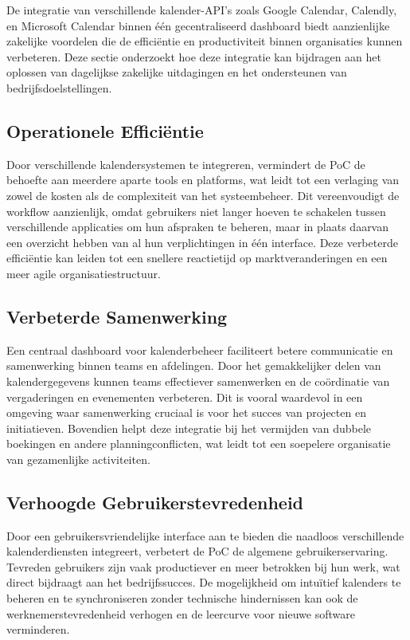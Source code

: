 De integratie van verschillende kalender-API's zoals Google Calendar, Calendly, en Microsoft Calendar binnen één gecentraliseerd dashboard biedt aanzienlijke zakelijke voordelen die de efficiëntie en productiviteit binnen organisaties kunnen verbeteren. Deze sectie onderzoekt hoe deze integratie kan bijdragen aan het oplossen van dagelijkse zakelijke uitdagingen en het ondersteunen van bedrijfsdoelstellingen.

\subsection{Operationele Efficiëntie}

Door verschillende kalendersystemen te integreren, vermindert de PoC de behoefte aan meerdere aparte tools en platforms, wat leidt tot een verlaging van zowel de kosten als de complexiteit van het systeembeheer. Dit vereenvoudigt de workflow aanzienlijk, omdat gebruikers niet langer hoeven te schakelen tussen verschillende applicaties om hun afspraken te beheren, maar in plaats daarvan een overzicht hebben van al hun verplichtingen in één interface. Deze verbeterde efficiëntie kan leiden tot een snellere reactietijd op marktveranderingen en een meer agile organisatiestructuur.

\subsection{Verbeterde Samenwerking}

Een centraal dashboard voor kalenderbeheer faciliteert betere communicatie en samenwerking binnen teams en afdelingen. Door het gemakkelijker delen van kalendergegevens kunnen teams effectiever samenwerken en de coördinatie van vergaderingen en evenementen verbeteren. Dit is vooral waardevol in een omgeving waar samenwerking cruciaal is voor het succes van projecten en initiatieven. Bovendien helpt deze integratie bij het vermijden van dubbele boekingen en andere planningconflicten, wat leidt tot een soepelere organisatie van gezamenlijke activiteiten.

\subsection{Verhoogde Gebruikerstevredenheid}

Door een gebruikersvriendelijke interface aan te bieden die naadloos verschillende kalenderdiensten integreert, verbetert de PoC de algemene gebruikerservaring. Tevreden gebruikers zijn vaak productiever en meer betrokken bij hun werk, wat direct bijdraagt aan het bedrijfssucces. De mogelijkheid om intuïtief kalenders te beheren en te synchroniseren zonder technische hindernissen kan ook de werknemerstevredenheid verhogen en de leercurve voor nieuwe software verminderen.


